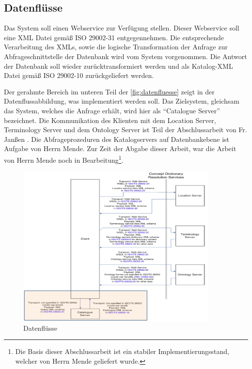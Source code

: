 \subsection{Datenflüsse}  
Das System soll einen \gls{Webservice} zur Verfügung stellen. Dieser \gls{Webservice} soll eine XML Datei gemäß ISO 29002-31 entgegennehmen. Die entsprechende Verarbeitung des XMLs, sowie die logische Transformation der Anfrage zur Abfrageschnittstelle der Datenbank wird vom System vorgenommen. Die Antwort der Datenbank soll wieder zurücktransformiert werden und als Katalog-XML Datei gemäß ISO 29002-10 zurückgeliefert werden.
 
Der gerahmte Bereich im unteren Teil der \autoref{fig:datenfluesse} zeigt in der Datenflussabbildung, was implementiert werden soll. Das Zielsystem, gleichsam das System, welches die Anfrage erhält, wird hier als \enquote{Catalogue Server} bezeichnet. 
Die Kommunikation des Klienten mit dem Location Server, Terminology Server und dem Ontology Server ist Teil der Abschlussarbeit von Fr. Janßen \citep[Vergl.][]{janssen}. 
Die Abfrageprozeduren des Katalogservers auf Datenbankebene ist Aufgabe von Herrn Mende. Zur Zeit der Abgabe dieser Arbeit, war die Arbeit von Herrn Mende noch in Bearbeitung\footnote{Die Basis dieser Abschlussarbeit ist ein stabiler Implementierungsstand, welcher von Herrn Mende geliefert wurde.}. 

\begin{figure}[htbp]
	\centering
		\includegraphics[width=0.90\textwidth]{images/datenfluesse_plib.jpg}
	\caption[Datenflüsse]{Datenflüsse\footnotemark}
	\label{fig:datenfluesse}
\end{figure}
